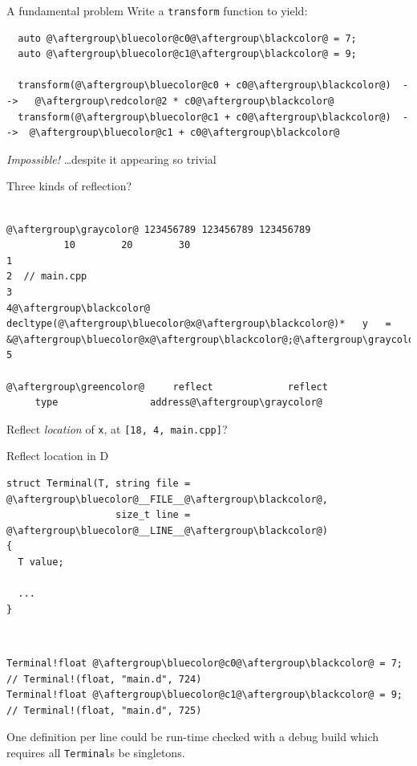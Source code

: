 \documentclass[xcolor=dvipsnames]{beamer}
\begin{document}
\begin{frame}[fragile]{A fundamental problem}
Write a \texttt{transform} function to yield:\vspace{10mm}
\begin{lstlisting}
  auto @\aftergroup\bluecolor@c0@\aftergroup\blackcolor@ = 7;
  auto @\aftergroup\bluecolor@c1@\aftergroup\blackcolor@ = 9;

  transform(@\aftergroup\bluecolor@c0 + c0@\aftergroup\blackcolor@)  -->   @\aftergroup\redcolor@2 * c0@\aftergroup\blackcolor@
  transform(@\aftergroup\bluecolor@c1 + c0@\aftergroup\blackcolor@)  -->  @\aftergroup\bluecolor@c1 + c0@\aftergroup\blackcolor@
\end{lstlisting}
\vspace{10mm}
\emph{Impossible!}
\ldots despite it appearing so trivial
\end{frame}


\begin{frame}[fragile]{Three kinds of reflection?}
  \begin{lstlisting}

@\aftergroup\graycolor@ 123456789 123456789 123456789
          10        20        30
1
2  // main.cpp
3
4@\aftergroup\blackcolor@  decltype(@\aftergroup\bluecolor@x@\aftergroup\blackcolor@)*   y   =   &@\aftergroup\bluecolor@x@\aftergroup\blackcolor@;@\aftergroup\graycolor@
5

@\aftergroup\greencolor@     reflect             reflect
     type                address@\aftergroup\graycolor@
  \end{lstlisting}
 \vspace{10mm}
Reflect \emph{location} of {\color{blue}\texttt{x}}, at {\color{red}\texttt{[18, 4, main.cpp]}}?
\end{frame}


\begin{frame}[fragile]{Reflect location in D}
\begin{lstlisting}
struct Terminal(T, string file = @\aftergroup\bluecolor@__FILE__@\aftergroup\blackcolor@,
                   size_t line = @\aftergroup\bluecolor@__LINE__@\aftergroup\blackcolor@)
{
  T value;

  ...
}
\end{lstlisting}

~

\begin{lstlisting}
Terminal!float @\aftergroup\bluecolor@c0@\aftergroup\blackcolor@ = 7; // Terminal!(float, "main.d", 724)
Terminal!float @\aftergroup\bluecolor@c1@\aftergroup\blackcolor@ = 9; // Terminal!(float, "main.d", 725)
\end{lstlisting}

\vspace{10mm}
{One definition per line could be run-time checked with a debug build which requires all \texttt{Terminal}s be singletons.}
\end{frame}


\begin{frame}[plain]
  \titlepage
\end{frame}
\end{document}
